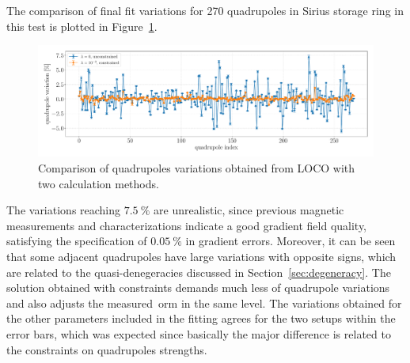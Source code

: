The comparison of final fit variations for 270 quadrupoles in Sirius storage ring in this test is plotted in Figure~\ref{fig:dkl_compare}. 
\begin{figure}
\centering
\includegraphics[width=1.0\textwidth]{figures/delta_kl_comparison_better_grid.pdf}
\caption{Comparison of quadrupoles variations obtained from LOCO with two calculation methods.}
\label{fig:dkl_compare}
\end{figure}

The variations reaching $\SI{7.5}{\%}$ are unrealistic, since previous magnetic measurements and characterizations indicate a good gradient field quality, satisfying the specification of $\SI{0.05}{\%}$ in gradient errors. Moreover, it can be seen that some adjacent quadrupoles have large variations with opposite signs, which are related to the quasi-denegeracies discussed in Section~\ref{sec:degeneracy}. The solution obtained with constraints demands much less of quadrupole variations and also adjusts the measured~\gls{orm} in the same level. The variations obtained for the other parameters included in the fitting agrees for the two setups within the error bars, which was expected since basically the major difference is related to the constraints on quadrupoles strengths.

